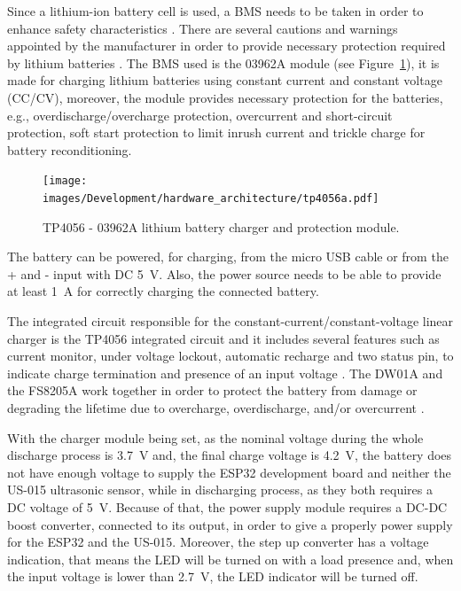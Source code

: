 Since a lithium-ion battery cell is used, a \gls{BMS} needs to be taken in order to enhance safety characteristics \cite{MALGORZATA:2014}. There are several cautions and warnings appointed by the manufacturer in order to provide necessary protection required by lithium batteries \cite{datasheet:18650}. The \gls{BMS} used is the 03962A module (see Figure~\ref{fig:tp4056}), it is made for charging lithium batteries using constant current and constant voltage (CC/CV), moreover, the module provides necessary protection for the batteries, e.g., overdischarge/overcharge protection, overcurrent and short-circuit protection, soft start protection to limit inrush current and trickle charge for battery reconditioning. 

\begin{figure}[h!]
    \centering
    \texttt{[image: images/Development/hardware\_architecture/tp4056a.pdf]}
    \caption{TP4056 - 03962A lithium battery charger and protection module.}
    \label{fig:tp4056}
\end{figure}

The battery can be powered, for charging, from the micro USB cable or from the + and - input with \gls{DC} 5~V. Also, the power source needs to be able to provide at least 1~A for correctly charging the connected battery. 

The integrated circuit responsible for the constant-current/constant-voltage linear charger is the TP4056 integrated circuit and it includes several features such as current monitor, under voltage lockout, automatic recharge and two status pin, to indicate charge termination and presence of an input voltage \cite{datasheet:TP4056}. The DW01A and the FS8205A work together in order to protect the battery from damage or degrading the lifetime due to overcharge, overdischarge, and/or overcurrent \cite{datasheet:DW01A, datasheet:FS8205A}.

With the charger module being set, as the nominal voltage during the whole discharge process is 3.7~V and, the final charge voltage is 4.2~V, the battery does not have enough voltage to supply the ESP32 development board and neither the US-015 ultrasonic sensor, while in discharging process, as they both requires a \gls{DC} voltage of 5~V. Because of that, the power supply module requires a \gls{DC}-\gls{DC} boost converter, connected to its output, in order to give a properly power supply for the ESP32 and the US-015. Moreover, the step up converter has a voltage indication, that means the \gls{LED} will be turned on with a load presence and, when the input voltage is lower than 2.7~V, the \gls{LED} indicator will be turned off. 

